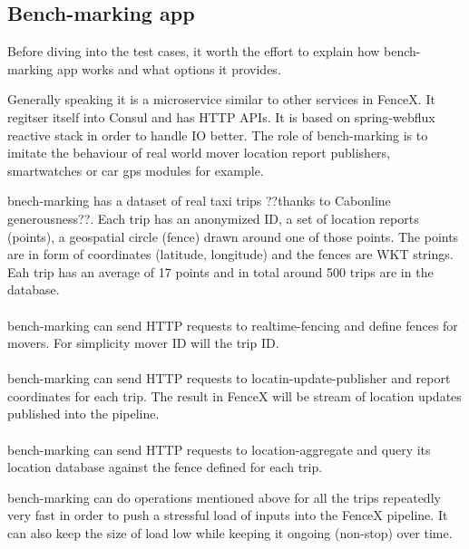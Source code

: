 \documentclass[a4]{report}
\begin{document}
    \subsection{Bench-marking app}
    Before diving into the test cases, it worth the effort to explain how bench-marking app works and what options it
    provides.

    Generally speaking it is a microservice similar to other services in FenceX.
    It regitser itself into Consul and has HTTP APIs.
    It is based on spring-webflux reactive stack in order to handle IO better.
    The role of bench-marking is to imitate the behaviour of real world mover location report publishers,
    smartwatches or car gps modules for example.

    bnech-marking has a dataset of real taxi trips ??thanks to Cabonline generousness??.
    Each trip has an anonymized ID, a set of location reports (points), a geospatial circle (fence) drawn around one of
    those
    points.
    The points are in form of coordinates (latitude, longitude) and the fences are WKT strings.
    Eah trip has an average of 17 points and in total around 500 trips are in the database.

    \paragraph{}
    bench-marking can send HTTP requests to realtime-fencing and define fences for movers.
    For simplicity mover ID will the trip ID.

    \paragraph{}
    bench-marking can send HTTP requests to locatin-update-publisher and report coordinates for each trip.
    The result in FenceX will be stream of location updates published into the pipeline.

    \paragraph{}
    bench-marking can send HTTP requests to location-aggregate and query its location database against the fence
    defined for each trip.

    bench-marking can do operations mentioned above for all the trips repeatedly very fast in order to push a
    stressful load of inputs into the FenceX pipeline.
    It can also keep the size of load low while keeping it ongoing (non-stop) over time.
\end{document}
